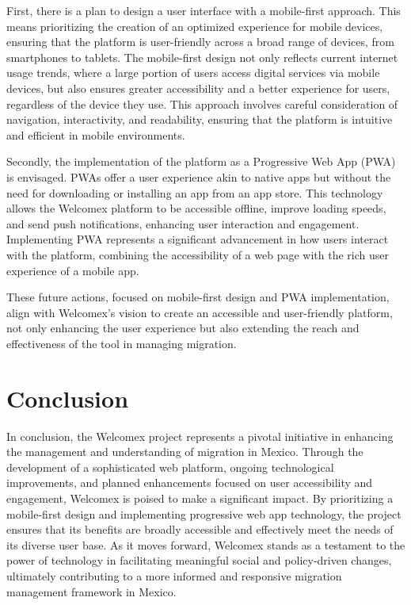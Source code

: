 \documentclass[conference]{IEEEtran}
\begin{document}
First, there is a plan to design a user interface with a mobile-first approach. This means prioritizing the creation of an optimized experience for mobile devices, ensuring that the platform is user-friendly across a broad range of devices, from smartphones to tablets. The mobile-first design not only reflects current internet usage trends, where a large portion of users access digital services via mobile devices, but also ensures greater accessibility and a better experience for users, regardless of the device they use. This approach involves careful consideration of navigation, interactivity, and readability, ensuring that the platform is intuitive and efficient in mobile environments.

Secondly, the implementation of the platform as a Progressive Web App (PWA) is envisaged. PWAs offer a user experience akin to native apps but without the need for downloading or installing an app from an app store. This technology allows the Welcomex platform to be accessible offline, improve loading speeds, and send push notifications, enhancing user interaction and engagement. Implementing PWA represents a significant advancement in how users interact with the platform, combining the accessibility of a web page with the rich user experience of a mobile app.

These future actions, focused on mobile-first design and PWA implementation, align with Welcomex's vision to create an accessible and user-friendly platform, not only enhancing the user experience but also extending the reach and effectiveness of the tool in managing migration.

\section{Conclusion}
In conclusion, the Welcomex project represents a pivotal initiative in enhancing the management and understanding of migration in Mexico. Through the development of a sophisticated web platform, ongoing technological improvements, and planned enhancements focused on user accessibility and engagement, Welcomex is poised to make a significant impact. By prioritizing a mobile-first design and implementing progressive web app technology, the project ensures that its benefits are broadly accessible and effectively meet the needs of its diverse user base. As it moves forward, Welcomex stands as a testament to the power of technology in facilitating meaningful social and policy-driven changes, ultimately contributing to a more informed and responsive migration management framework in Mexico.
\end{document}
